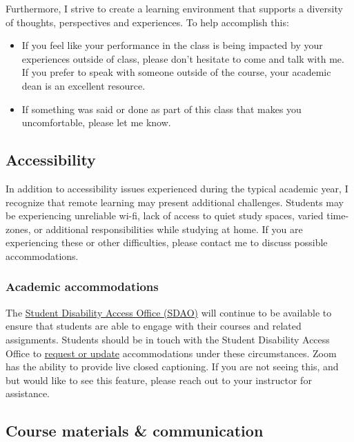 \documentclass[
]{article}
\providecommand{\tightlist}{%
  \setlength{\itemsep}{0pt}\setlength{\parskip}{0pt}}
\begin{document}
Furthermore, I strive to create a learning environment that supports a
diversity of thoughts, perspectives and experiences. To help accomplish
this:

\begin{itemize}
\tightlist
\item
  If you feel like your performance in the class is being impacted by
  your experiences outside of class, please don't hesitate to come and
  talk with me. If you prefer to speak with someone outside of the
  course, your academic dean is an excellent resource.
\item
  If something was said or done as part of this class that makes you
  uncomfortable, please let me know.
\end{itemize}

\hypertarget{accessibility}{%
\subsection{Accessibility}\label{accessibility}}

In addition to accessibility issues experienced during the typical
academic year, I recognize that remote learning may present additional
challenges. Students may be experiencing unreliable wi-fi, lack of
access to quiet study spaces, varied time-zones, or additional
responsibilities while studying at home. If you are experiencing these
or other difficulties, please contact me to discuss possible
accommodations.

\hypertarget{academic-accommodations}{%
\subsubsection{Academic accommodations}\label{academic-accommodations}}

The \href{https://access.duke.edu/students}{Student Disability Access
Office (SDAO)} will continue to be available to ensure that students are
able to engage with their courses and related assignments. Students
should be in touch with the Student Disability Access Office to
\href{https://access.duke.edu/requests}{request or update}
accommodations under these circumstances. Zoom has the ability to
provide live closed captioning. If you are not seeing this, and but
would like to see this feature, please reach out to your instructor for
assistance.

\hypertarget{course-materials-communication}{%
\subsection{Course materials \&
communication}\label{course-materials-communication}}
\end{document}
